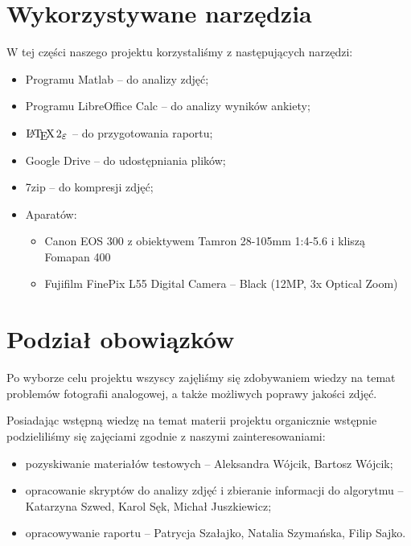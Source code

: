 \documentclass[]{mwart}
\begin{document}
\section{Wykorzystywane narzędzia}
W tej części naszego projektu korzystaliśmy z następujących narzędzi:
\begin{itemize}
    \item Programu Matlab -- do analizy zdjęć;
    \item Programu LibreOffice Calc -- do analizy wyników ankiety;
    \item $\LaTeXe{}$ -- do przygotowania raportu;
    \item Google Drive -- do udostępniania plików;
    \item 7zip -- do kompresji zdjęć;
    \item Aparatów:
          \begin{itemize}
              \item Canon EOS 300 z obiektywem Tamron 28-105mm 1:4-5.6 i kliszą Fomapan 400
              \item Fujifilm FinePix L55 Digital Camera -- Black (12MP, 3x Optical Zoom)
          \end{itemize}
\end{itemize}


\section{Podział obowiązków}
Po wyborze celu projektu wszyscy zajęliśmy się zdobywaniem wiedzy na
temat problemów fotografii analogowej, a także możliwych poprawy jakości zdjęć.\newline


Posiadając wstępną wiedzę na temat materii projektu organicznie wstępnie
podzieliliśmy się zajęciami zgodnie z naszymi zainteresowaniami: \newline
\begin{itemize}
    \item pozyskiwanie materiałów testowych -- Aleksandra Wójcik, Bartosz Wójcik;
    \item opracowanie skryptów do analizy zdjęć i zbieranie informacji do algorytmu -- Katarzyna Szwed, Karol Sęk, Michał Juszkiewicz;
    \item opracowywanie raportu -- Patrycja Szałajko, Natalia Szymańska, Filip Sajko.
\end{itemize}
\end{document}
